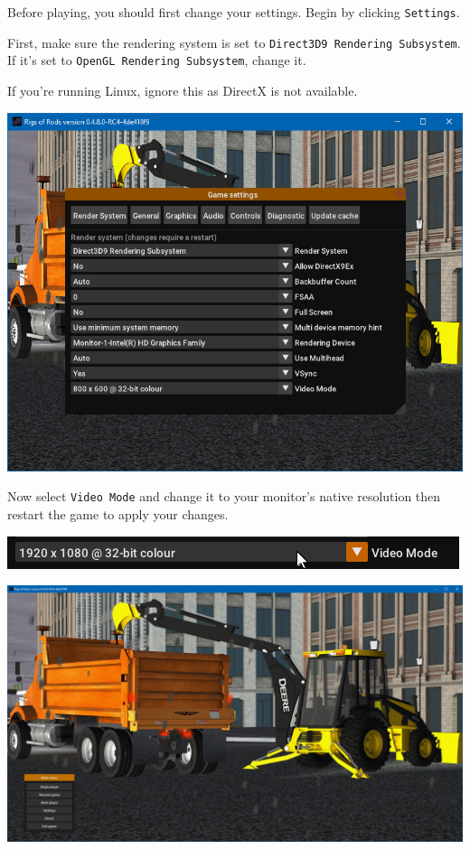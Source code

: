 Before playing, you should first change your settings. Begin by clicking
\texttt{Settings}.

First, make sure the rendering system is set to
\texttt{Direct3D9\ Rendering\ Subsystem}. If it's set to
\texttt{OpenGL\ Rendering\ Subsystem}, change it.

If you're running Linux, ignore this as DirectX is not available.

\includegraphics{images/bg-firstrun2.png}

Now select \texttt{Video\ Mode} and change it to your monitor's native
resolution then restart the game to apply your changes.

\includegraphics{images/bg-firstrun3.png}

\includegraphics{images/bg-firstrun4.png}

